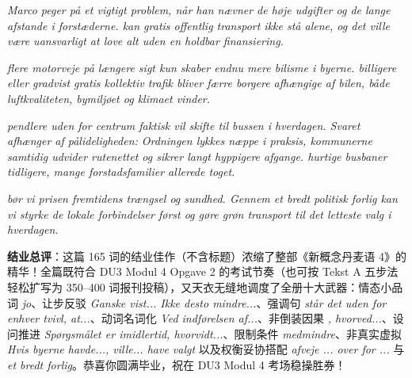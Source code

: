 \begin{answerbox}
\textit{Marco peger  på et vigtigt problem, når han nævner de høje udgifter og de lange afstande i forstæderne.  kan gratis offentlig transport ikke stå alene, og det ville være uansvarligt at love alt uden en holdbar finansiering.}

\textit{  flere motorveje på længere sigt kun skaber endnu mere bilisme i byerne.  billigere eller gradvist gratis kollektiv trafik bliver færre borgere afhængige af bilen,  både luftkvaliteten, bymiljøet og klimaet vinder.}

\textit{ pendlere uden for centrum faktisk vil skifte til bussen i hverdagen. Svaret afhænger af pålideligheden: Ordningen lykkes næppe i praksis,  kommunerne samtidig udvider rutenettet og sikrer langt hyppigere afgange.  hurtige busbaner tidligere,  mange forstadsfamilier allerede  toget.}

\textit{ bør vi  prisen  fremtidens trængsel og sundhed. Gennem et bredt politisk forlig kan vi styrke de lokale forbindelser først og gøre grøn transport til det letteste valg i hverdagen.}

\small\textbf{结业总评}：这篇 165 词的结业佳作（不含标题）浓缩了整部《新概念丹麦语 4》的精华！全篇既符合 DU3 Modul 4 Opgave 2 的考试节奏（也可按 Tekst A 五步法轻松扩写为 350--400 词报刊投稿），又天衣无缝地调度了全册十大武器：情态小品词 \textit{jo}、让步反驳 \textit{Ganske vist... Ikke desto mindre...}、强调句 \textit{står det uden for enhver tvivl, at...}、动词名词化 \textit{Ved indførelsen af...}、非倒装因果 \textit{, hvorved...}、设问推进 \textit{Spørgsmålet er imidlertid, hvorvidt...}、限制条件 \textit{medmindre}、非真实虚拟 \textit{Hvis byerne havde..., ville... have valgt} 以及权衡妥协搭配 \textit{afveje ... over for ...} 与 \textit{et bredt forlig}。恭喜你圆满毕业，祝在 DU3 Modul 4 考场稳操胜券！
\end{answerbox}
